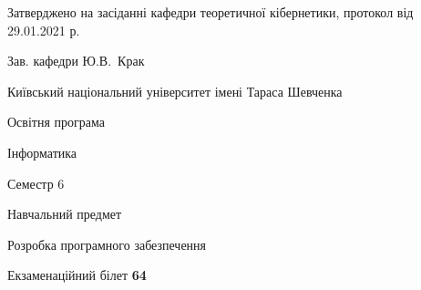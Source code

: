 \documentclass[10pt, ukrainian]{article}
\begin{document}
{\vspace{5mm}\smallskip \begin {small} Затверджено на засіданні кафедри теоретичної кібернетики, протокол  від   29.01.2021 р.\par\smallskip\smallskip
{\parbox {6.5 cm}{Зав. кафедри \dotfill Ю.В.~Крак}} \end{small}}
\newpage

{{\begin {small}\par
{ \center  Київський національний університет імені Тараса Шевченка \par}
{\parbox {5 cm}{Освітня програма \hfill}{\parbox {7 cm}{Інформатика \hfill}}\parbox {6 cm}{\hfill Семестр 6}}\par
{\parbox {5 cm} {Навчальний предмет \hfill}\parbox {7 cm}{Розробка програмного забезпечення \hfill}\parbox {6cm}{\hfill}\par}\vspace{-7pt} \end{small}}{\center Екзаменаційний білет \No \textbf
{ 64 }\par}}
\end{document}

